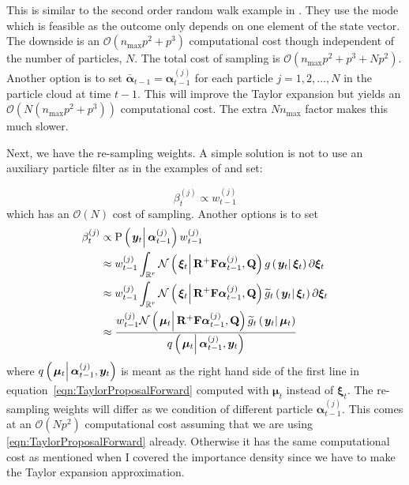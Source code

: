\documentclass[9pt, notitlepage]{article}
\renewcommand{\vec}[1]{\bm{#1}}
\newcommand{\vecb}[1]{\bar{\vec{#1}}}
\newcommand{\mat}[1]{\mathbf{#1}}
\newcommand{\Lparen}[1]{\left( #1\right)}
\newcommand{\Cond}[2]{\left. #1 \vphantom{#2} \right\vert  #2}
\newcommand{\Prob}{\text{P}}
\newcommand{\optor}[2]{#1\Lparen{#2}}
\newcommand{\optorC}[3]{\optor{#1}{\Cond{#2}{#3}}}
\newcommand{\propC}[2]{\optorC{\Prob}{#1}{#2}}
\newcommand{\normalC}[3]{\optorC{\mathcal{N}}{#1}{#2,#3}}
\newcommand{\IDC}[2]{\optorC{q}{#1}{#2}}
\newcommand{\partic}[3]{#1_{#2}^{\Lparen{#3}}}
\newcommand{\bigO}[1]{\mathcal{O}\Lparen{#1}}
\newcommand{\dimState}{p}
\newcommand{\dimRng}{r}
\newcommand{\nPart}{N}
\newcommand{\nMax}{n_{\text{max}}}
\begin{document}
This is similar to the second order random walk example in \cite{fearnhead10}. They use the mode which is feasible as the outcome only depends on one element of the state vector. The downside is an $\bigO{\nMax \dimState^2+\dimState^3}$ computational cost though independent of the number of particles, $\nPart$. The total cost of sampling is $\bigO{\nMax\dimState^2+\dimState^3 + \nPart\dimState^2}$. Another option is to set $\vecb{\alpha}_{t - 1} = \partic{\vec{\alpha}}{t-1}{j}$ for each particle $j = 1, 2, \dots, \nPart$ in the particle cloud at time $t - 1$. This will improve the Taylor expansion but yields an $\bigO{\nPart\Lparen{\nMax\dimState^2+\dimState^3}}$ computational cost. The extra $\nPart\nMax$ factor makes this much slower.

Next, we have the re-sampling weights. A simple solution is not to use an auxiliary particle filter as in the examples of \cite{fearnhead10} and set:

\begin{equation}
	\partic{\beta}{t}{j} \propto \partic{w}{t-1}{j}
\end{equation}
%
which has an $\bigO{\nPart}$ cost of sampling. Another options is to set%
%
\begin{equation}\label{eqn:FWWeights}
\begin{split}
	\partic{\beta}{t}{j} &\propto  \propC{\vec{y}_t}{\partic{\vec{\alpha}}{t-1}{j}}\partic{w}{t-1}{j} \\
%
	& \approx \partic{w}{t-1}{j} \int_{\mathbb{R}^\dimRng}
		\normalC{\vec{\xi}_t}{\mat{R}^{+}\mat{F}\partic{\vec{\alpha}}{t-1}{j}}{\mat{Q}}
		\optorC{g}{\vec{y}_t}{\vec{\xi}_t}
		\partial \vec{\xi}_t \\
%
	& \approx \partic{w}{t-1}{j} \int_{\mathbb{R}^\dimRng}
		\normalC{\vec{\xi}_t}{\mat{R}^{+}\mat{F}\partic{\vec{\alpha}}{t-1}{j}}{\mat{Q}}
		\optorC{\widetilde{g}_t}{\vec{y}_t}{\vec{\xi}_t}
		\partial \vec{\xi}_t \\
%
	& \approx \frac{
		\partic{w}{t-1}{j}
		\normalC{\vec{\mu}_t}{\mat{R}^{+}\mat{F}\partic{\vec{\alpha}}{t-1}{j}}{\mat{Q}}
		\optorC{\widetilde{g}_t}{\vec{y}_t}{\vec{\mu}_t}
	}{ %
		\IDC{\vec{\mu}_t}{\partic{\vec{\alpha}}{t-1}{j}, \vec{y}_t}
	}
\end{split}
\end{equation}%
%
where $\IDC{\vec{\mu}_t}{\partic{\vec{\alpha}}{t-1}{j}, \vec{y}_t}$ is meant as the right hand side of the first line in equation~\eqref{eqn:TaylorProposalForward} computed with $\vec{\mu}_t$ instead of $\vec{\xi}_t$. The re-sampling weights will differ as we condition of different particle $\partic{\vec{\alpha}}{t-1}{j}$. This comes at an $\bigO{\nPart\dimState^2}$ computational cost assuming that we are using \eqref{eqn:TaylorProposalForward} already. Otherwise it has the same computational cost as mentioned when I covered the importance density since we have to make the Taylor expansion approximation.
\end{document}
